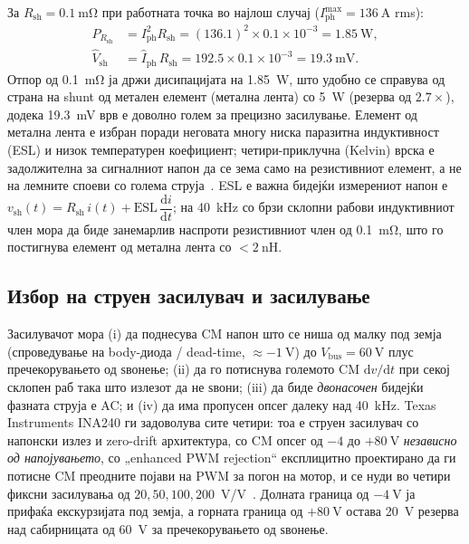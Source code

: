 \documentclass[journal,onecolumn,11pt]{IEEEtran}
\newcommand{\Vdcbus}{V_{\mathrm{bus}}}
\newcommand{\Rshunt}{R_{\mathrm{sh}}}
\newcommand{\Iphrms}{I_{\mathrm{ph}}}
\begin{document}
За $\Rshunt=\SI{0.1}{\milli\ohm}$ при работната точка во најлош случај
($\Iphrms^{\max}=\SI{136}{\ampere}$ rms):
\begin{align}
P_{\Rshunt} &=\Iphrms^{2}\Rshunt=(136.1)^2\times 0.1\times10^{-3}=\SI{1.85}{\watt},\\
\hat V_{\mathrm{sh}} &=\hat I_{\mathrm{ph}}\,\Rshunt=192.5\times 0.1\times10^{-3}=\SI{19.3}{\milli\volt}.
\end{align}
Отпор од \SI{0.1}{\milli\ohm} ја држи дисипацијата на \SI{1.85}{\watt}, што удобно се
справува од страна на shunt од метален елемент (метална лента) со \SI{5}{\watt}
(резерва од $2.7\times$), додека \SI{19.3}{\milli\volt} врв е доволно голем за
прецизно засилување. Елемент од метална лента е избран поради неговата многу ниска
паразитна индуктивност (ESL) и низок температурен коефициент; четири-приклучна
(Kelvin) врска е задолжителна за сигналниот напон да се зема само на резистивниот
елемент, а не на лемните споеви со голема струја~\cite{ina240ds}. ESL е важна бидејќи
измерениот напон е $v_{\mathrm{sh}}(t)=\Rshunt\,i(t)+\mathrm{ESL}\,\dfrac{\mathrm{d}i}{\mathrm{d}t}$;
на \SI{40}{\kilo\hertz} со брзи склопни рабови индуктивниот член мора да биде
занемарлив наспроти резистивниот член од \SI{0.1}{\milli\ohm}, што го постигнува
елемент од метална лента со $<\SI{2}{\nano\henry}$.

\subsection{Избор на струен засилувач и засилување}\label{sec:csa}
Засилувачот мора (i) да поднесува CM напон што се ниша од малку под земја
(спроведување на body-диода / dead-time, $\approx\SI{-1}{\volt}$) до
$\Vdcbus=\SI{60}{\volt}$ плус пречекорувањето од ѕвонење; (ii) да го потиснува
големото CM $\mathrm{d}v/\mathrm{d}t$ при секој склопен раб така што излезот да не
ѕвони; (iii) да биде \emph{двонасочен} бидејќи фазната струја е AC; и (iv) да има
пропусен опсег далеку над \SI{40}{\kilo\hertz}. Texas Instruments INA240 ги задоволува
сите четири: тоа е струен засилувач со напонски излез и zero-drift архитектура, со CM
опсег од $-4$ до $+\SI{80}{\volt}$ \emph{независно од напојувањето}, со „enhanced PWM
rejection“ експлицитно проектирано да ги потисне CM преодните појави на PWM за погон
на мотор, и се нуди во четири фиксни засилувања од $20,50,100,200$~V/V~\cite{ina240ds}.
Долната граница од $-\SI{4}{\volt}$ ја прифаќа екскурзијата под земја, а горната
граница од $+\SI{80}{\volt}$ остава \SI{20}{\volt} резерва над сабирницата од
\SI{60}{\volt} за пречекорувањето од ѕвонење.
\end{document}
